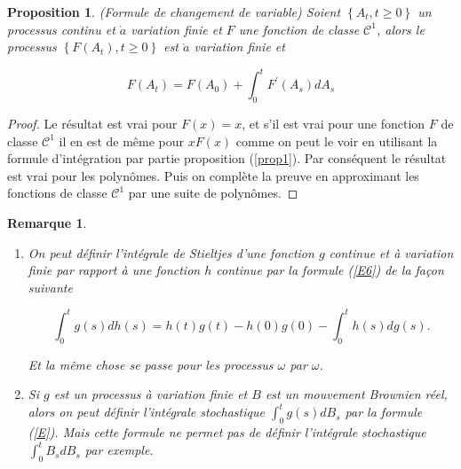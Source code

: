 \documentclass[A4paper,12pt]{report}
\newtheorem{proposition}{Proposition}[chapter]
\newtheorem{remark}{Remarque}[chapter]
\begin{document}
\begin{proposition}
(Formule de changement de variable) Soient $\left\{A_{t}, t \geq 0\right\}$ un processus continu et $\grave{a}$ variation finie et $F$ une fonction de classe $\mathcal{C}^{1}$, alors le processus $\left\{F\left(A_{t}\right), t \geq 0\right\}$ est $\grave{a}$ variation finie et

\begin{equation}\label{E7}
F\left(A_{t}\right)=F\left(A_{0}\right)+\int_{0}^{t} F^{\prime}\left(A_{s}\right) d A_{s} 
\end{equation}

\end{proposition}
\begin{proof}
Le résultat est vrai pour $F(x)=x$, et s'il est vrai pour une fonction $F$ de classe $\mathcal{C}^{1}$ il en est de même pour $x F(x)$ comme on peut le voir en utilisant la formule d'intégration par partie proposition (\ref{prop1}). Par conséquent le résultat est vrai pour les polynômes. Puis on complète la preuve en approximant les fonctions de classe $\mathcal{C}^{1}$ par une suite de polynômes.
\end{proof} 
\begin{remark} 
\begin{enumerate}
\item On peut définir l'intégrale de Stieltjes d'une fonction $g$ continue et à variation finie par rapport à une fonction $h$ continue par la formule (\ref{E6}) de la façon suivante

\begin{equation}\label{E}
\int_{0}^{t} g(s) d h(s)=h(t) g(t)-h(0) g(0)-\int_{0}^{t} h(s) d g(s) .
\end{equation}


Et la même chose se passe pour les processus $\omega$ par $\omega$.
\item Si $g$ est un processus à variation finie et $B$ est un mouvement Brownien réel, alors on peut définir l'intégrale stochastique $\int_{0}^{t} g(s) d B_{s}$ par la formule (\ref{E}). Mais cette formule ne permet pas de définir l'intégrale stochastique $\int_{0}^{t} B_{s} d B_{s}$ par exemple.
\end{enumerate}
\end{remark}
\end{document}

